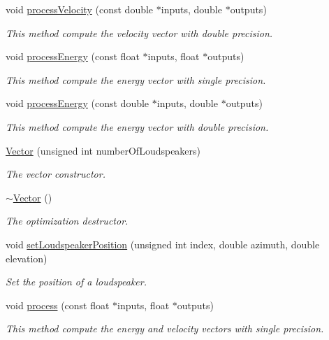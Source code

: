 \begin{DoxyCompactItemize}
void \hyperlink{class_hoa3_d_1_1_vector_a34ae72be81e72815e057e716a0f24d36}{process\-Velocity} (const double $\ast$inputs, double $\ast$outputs)
\begin{DoxyCompactList}\small\item\em This method compute the velocity vector with double precision. \end{DoxyCompactList}\item 
void \hyperlink{class_hoa3_d_1_1_vector_a7abd76a93ade46d069c922064f14c1b7}{process\-Energy} (const float $\ast$inputs, float $\ast$outputs)
\begin{DoxyCompactList}\small\item\em This method compute the energy vector with single precision. \end{DoxyCompactList}\item 
void \hyperlink{class_hoa3_d_1_1_vector_a28ad63d95b4d2c1ccabdada1955f5f96}{process\-Energy} (const double $\ast$inputs, double $\ast$outputs)
\begin{DoxyCompactList}\small\item\em This method compute the energy vector with double precision. \end{DoxyCompactList}\item 
\hyperlink{class_hoa3_d_1_1_vector_a0a3ee9bd9477f9d20e123691c2e80315}{Vector} (unsigned int number\-Of\-Loudspeakers)
\begin{DoxyCompactList}\small\item\em The vector constructor. \end{DoxyCompactList}\item 
\hyperlink{class_hoa3_d_1_1_vector_a0f7403e0ae42fe40f54fcb35977bf95c}{$\sim$\-Vector} ()
\begin{DoxyCompactList}\small\item\em The optimization destructor. \end{DoxyCompactList}\item 
void \hyperlink{class_hoa3_d_1_1_vector_afab0f404886f74f5a139210d1a497936}{set\-Loudspeaker\-Position} (unsigned int index, double azimuth, double elevation)
\begin{DoxyCompactList}\small\item\em Set the position of a loudspeaker. \end{DoxyCompactList}\item 
void \hyperlink{class_hoa3_d_1_1_vector_a7818f4b944e66d27f08de1965c18e2bd}{process} (const float $\ast$inputs, float $\ast$outputs)
\begin{DoxyCompactList}\small\item\em This method compute the energy and velocity vectors with single precision. \end{DoxyCompactList}\item 

\end{DoxyCompactItemize}
